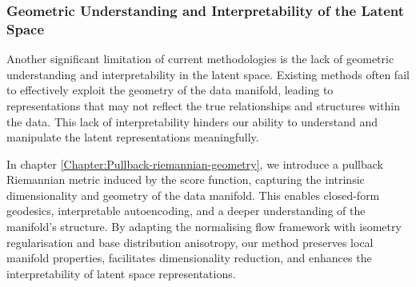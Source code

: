 \subsubsection{Geometric Understanding and Interpretability of the Latent Space}

Another significant limitation of current methodologies is the lack of geometric understanding and interpretability in the latent space. Existing methods often fail to effectively exploit the geometry of the data manifold, leading to representations that may not reflect the true relationships and structures within the data. This lack of interpretability hinders our ability to understand and manipulate the latent representations meaningfully.


In chapter \ref{Chapter:Pullback-riemannian-geometry}, we introduce a pullback Riemannian metric induced by the score function, capturing the intrinsic dimensionality and geometry of the data manifold. This enables closed-form geodesics, interpretable autoencoding, and a deeper understanding of the manifold's structure. By adapting the normalising flow framework with isometry regularisation and base distribution anisotropy, our method preserves local manifold properties, facilitates dimensionality reduction, and enhances the interpretability of latent space representations.
